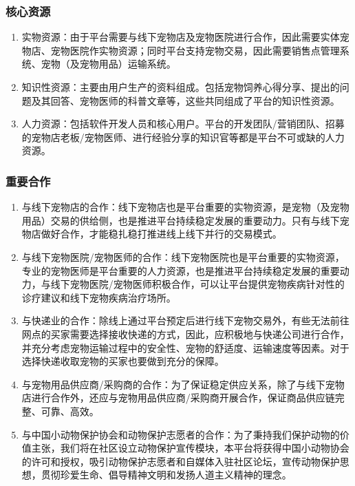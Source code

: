\documentclass[a4paper]{ctexart}
\begin{document}
\subsubsection{核心资源}

\begin{enumerate}[label=\alph*.]
  \item 实物资源：由于平台需要与线下宠物店及宠物医院进行合作，因此需要实体宠物店、宠物医院作实物资源；同时平台支持宠物交易，因此需要销售点管理系统、宠物（及宠物用品）运输系统。
  \item 知识性资源：主要由用户生产的资料组成。包括宠物饲养心得分享、提出的问题及其回答、宠物医师的科普文章等，这些共同组成了平台的知识性资源。
  \item 人力资源：包括软件开发人员和核心用户。平台的开发团队/营销团队、招募的宠物店老板/宠物医师、进行经验分享的知识官等都是平台不可或缺的人力资源。
\end{enumerate}

\subsubsection{重要合作}

\begin{enumerate}[label=\alph*.]
  \item 与线下宠物店的合作：线下宠物店也是平台重要的实物资源，是宠物（及宠物用品）交易的供给侧，也是推进平台持续稳定发展的重要动力。只有与线下宠物店做好合作，才能稳扎稳打推进线上线下并行的交易模式。
  \item 与线下宠物医院/宠物医师的合作：线下宠物医院也是平台重要的实物资源，专业的宠物医师是平台重要的人力资源，也是推进平台持续稳定发展的重要动力，与线下宠物医院/宠物医师积极合作，可以让平台提供宠物疾病针对性的诊疗建议和线下宠物疾病治疗场所。
  \item 与快递业的合作：除线上通过平台预定后进行线下宠物交易外，有些无法前往网点的买家需要选择接收快递的方式，因此，应积极地与快递公司进行合作，并充分考虑宠物运输过程中的安全性、宠物的舒适度、运输速度等因素。对于选择快递收取宠物的买家也要做到充分的保障。
  \item 与宠物用品供应商/采购商的合作：为了保证稳定供应关系，除了与线下宠物店进行合作外，还应与宠物用品供应商/采购商开展合作，保证商品供应链完整、可靠、高效。
  \item 与中国小动物保护协会和动物保护志愿者的合作：为了秉持我们保护动物的价值主张，我们将在社区设立动物保护宣传模块，本平台将获得中国小动物协会的许可和授权，吸引动物保护志愿者和自媒体入驻社区论坛，宣传动物保护思想，贯彻珍爱生命、倡导精神文明和发扬人道主义精神的理念。
\end{enumerate}
\end{document}
